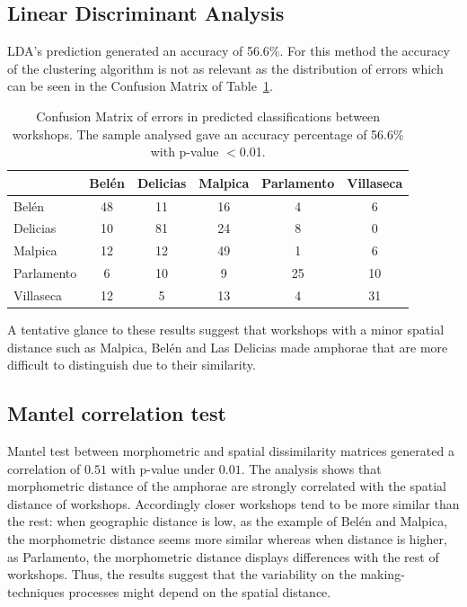 \documentclass[review]{elsarticle}
\begin{document}
\subsection{Linear Discriminant Analysis}

LDA's prediction generated an accuracy of 56.6\%. For this method the accuracy of the clustering algorithm is not as relevant as the distribution of errors which can be seen in the Confusion Matrix of Table~\ref{table:confusion}.

\begin{table}[htp]
\begin{tabular}{lccccc}
\hline
      & Belén & Delicias & Malpica & Parlamento & Villaseca\\ \hline
Belén & 48 & 11 & 16 & 4 & 6 \\
Delicias & 10 & 81 & 24 & 8 & 0 \\
Malpica & 12 & 12 & 49 & 1 & 6 \\
Parlamento & 6 & 10 & 9 & 25 & 10 \\
Villaseca & 12 & 5 & 13 & 4 & 31 \\
\hline

\end{tabular}
\caption{Confusion Matrix of errors in predicted classifications between workshops. The sample analysed gave an accuracy percentage of 56.6\% with p-value $<$0.01. }
\label{table:confusion}
\end{table}

A tentative glance to these results suggest that workshops with a minor spatial distance such as Malpica, Belén and Las Delicias made amphorae that are more difficult to distinguish due to their similarity. 

\subsection{Mantel correlation test}

Mantel test between morphometric and spatial dissimilarity matrices generated a correlation of $0.51$ with p-value under $0.01$. The analysis shows that morphometric distance of the amphorae are strongly correlated with the spatial distance of workshops. Accordingly closer workshops tend to be more similar than the rest: when geographic distance is low, as the example of Belén and Malpica, the morphometric distance seems more similar whereas when distance is higher, as Parlamento, the morphometric distance displays differences with the rest of workshops. Thus, the results suggest that the variability on the making-techniques processes might depend on the spatial distance.   
\end{document}
